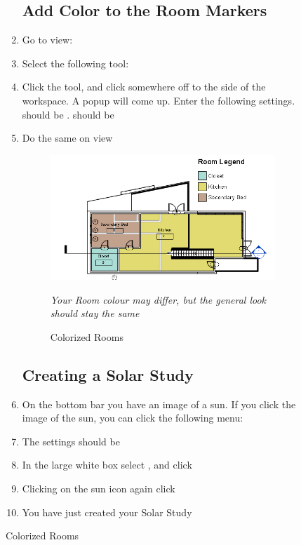 \documentclass{tufte-book} %
\begin{document}
\begin{figure}
\begin{enumerate}
	\subsection{Add Color to the Room Markers}
		\item Go to view: 
		\item Select the following tool: 
		\item Click the tool, and click somewhere off to the side of the workspace. A popup will come up. Enter the following settings.  should be .  should be 
		\item Do the same on view 
		
		\begin{figure}
			\includegraphics[width=\linewidth]{revitroomcolorfinal.png}
			\caption{Colorized Rooms}
			\emph{Your Room colour may differ, but the general look should stay the same}
			\label{fig:revroomcolor}
		\end{figure}
		

	\subsection{Creating a Solar Study}
		\item On the bottom bar you have an image of a sun. If you click the image of the sun, you can click the following menu: 
		\item The settings should be 
		\item In the large white box select , and click 
		\item Clicking on the sun icon again click 
		\item You have just created your Solar Study
		

\end{enumerate}
\end{figure}
\end{document}

